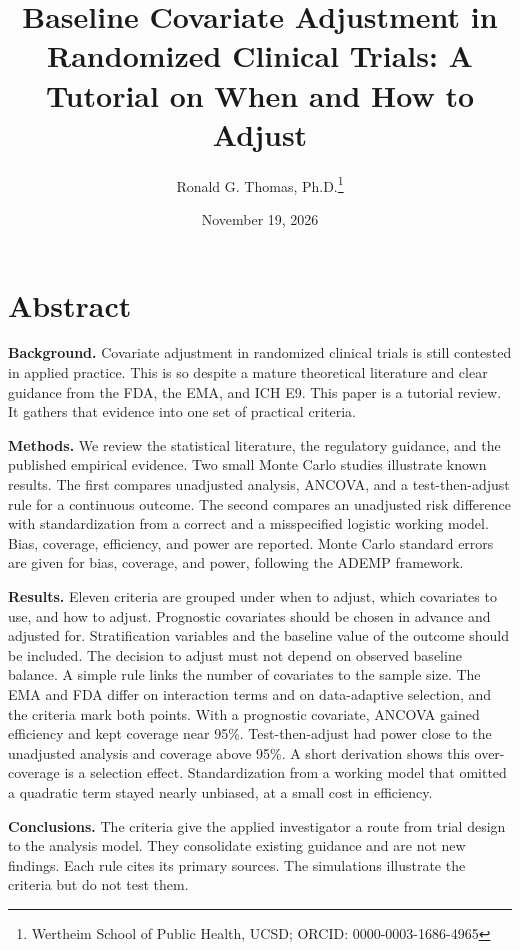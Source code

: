 \documentclass[
  11pt,
]{article}
\title{Baseline Covariate Adjustment in Randomized Clinical Trials: A Tutorial on When and How to Adjust}
\author{Ronald G. Thomas, Ph.D.\thanks{Wertheim School of Public Health, UCSD; ORCID: 0000-0003-1686-4965}}
\date{November 19, 2026}
\begin{document}
\maketitle

{
\setcounter{tocdepth}{2}
\tableofcontents
}
\section{Abstract}\label{abstract}

\textbf{Background.} Covariate adjustment in randomized clinical
trials is still contested in applied practice. This is so
despite a mature theoretical literature and clear guidance
from the FDA, the EMA, and ICH E9. This paper is a tutorial
review. It gathers that evidence into one set of practical
criteria.

\textbf{Methods.} We review the statistical literature, the
regulatory guidance, and the published empirical evidence.
Two small Monte Carlo studies illustrate known results. The
first compares unadjusted analysis, ANCOVA, and a
test-then-adjust rule for a continuous outcome. The second
compares an unadjusted risk difference with standardization
from a correct and a misspecified logistic working model.
Bias, coverage, efficiency, and power are reported. Monte
Carlo standard errors are given for bias, coverage, and
power, following the ADEMP framework.

\textbf{Results.} Eleven criteria are grouped under when to
adjust, which covariates to use, and how to adjust.
Prognostic covariates should be chosen in advance and
adjusted for. Stratification variables and the baseline
value of the outcome should be included. The decision to
adjust must not depend on observed baseline balance. A
simple rule links the number of covariates to the sample
size. The EMA and FDA differ on interaction terms and on
data-adaptive selection, and the criteria mark both points.
With a prognostic covariate, ANCOVA gained efficiency and
kept coverage near 95\%. Test-then-adjust had power close to
the unadjusted analysis and coverage above 95\%. A short
derivation shows this over-coverage is a selection effect.
Standardization from a working model that omitted a
quadratic term stayed nearly unbiased, at a small cost in
efficiency.

\textbf{Conclusions.} The criteria give the applied investigator
a route from trial design to the analysis model. They
consolidate existing guidance and are not new findings. Each
rule cites its primary sources. The simulations illustrate
the criteria but do not test them.
\end{document}
